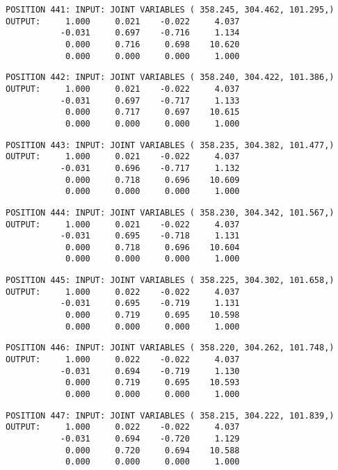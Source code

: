 \begin{verbatim}
POSITION 441: INPUT: JOINT VARIABLES ( 358.245, 304.462, 101.295,)
OUTPUT:     1.000     0.021    -0.022     4.037
           -0.031     0.697    -0.716     1.134
            0.000     0.716     0.698    10.620
            0.000     0.000     0.000     1.000
\end{verbatim} \pagebreak[1]\begin{verbatim}
POSITION 442: INPUT: JOINT VARIABLES ( 358.240, 304.422, 101.386,)
OUTPUT:     1.000     0.021    -0.022     4.037
           -0.031     0.697    -0.717     1.133
            0.000     0.717     0.697    10.615
            0.000     0.000     0.000     1.000
\end{verbatim} \pagebreak[1]\begin{verbatim}
POSITION 443: INPUT: JOINT VARIABLES ( 358.235, 304.382, 101.477,)
OUTPUT:     1.000     0.021    -0.022     4.037
           -0.031     0.696    -0.717     1.132
            0.000     0.718     0.696    10.609
            0.000     0.000     0.000     1.000
\end{verbatim} \pagebreak[1]\begin{verbatim}
POSITION 444: INPUT: JOINT VARIABLES ( 358.230, 304.342, 101.567,)
OUTPUT:     1.000     0.021    -0.022     4.037
           -0.031     0.695    -0.718     1.131
            0.000     0.718     0.696    10.604
            0.000     0.000     0.000     1.000
\end{verbatim} \pagebreak[1]\begin{verbatim}
POSITION 445: INPUT: JOINT VARIABLES ( 358.225, 304.302, 101.658,)
OUTPUT:     1.000     0.022    -0.022     4.037
           -0.031     0.695    -0.719     1.131
            0.000     0.719     0.695    10.598
            0.000     0.000     0.000     1.000
\end{verbatim} \pagebreak[1]\begin{verbatim}
POSITION 446: INPUT: JOINT VARIABLES ( 358.220, 304.262, 101.748,)
OUTPUT:     1.000     0.022    -0.022     4.037
           -0.031     0.694    -0.719     1.130
            0.000     0.719     0.695    10.593
            0.000     0.000     0.000     1.000
\end{verbatim} \pagebreak[1]\begin{verbatim}
POSITION 447: INPUT: JOINT VARIABLES ( 358.215, 304.222, 101.839,)
OUTPUT:     1.000     0.022    -0.022     4.037
           -0.031     0.694    -0.720     1.129
            0.000     0.720     0.694    10.588
            0.000     0.000     0.000     1.000
\end{verbatim} \pagebreak[1]\begin{verbatim}

\end{verbatim}
